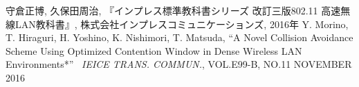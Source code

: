 \documentclass[a4paper, 10pt]{ltjsarticle}
\begin{document}




\begin{thebibliography}{9}
  守倉正博, 久保田周治, 『インプレス標準教科書シリーズ 改訂三版802.11 高速無線LAN教科書』, 株式会社インプレスコミュニケーションズ, 2016年
  Y. Morino, T. Hiraguri, H. Yoshino, K. Nishimori, T. Matsuda, ``A Novel Collision Avoidance Scheme Using Optimized Contention Window in Dense Wireless LAN Environments*'' \, \textit{IEICE TRANS. COMMUN.}, VOL.E99-B, NO.11 NOVEMBER 2016
\end{thebibliography}
\end{document}
